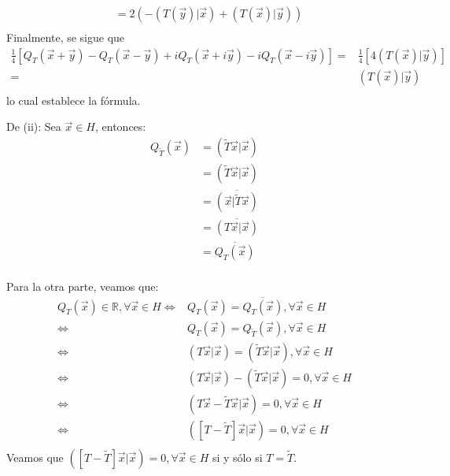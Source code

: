 \documentclass[12pt]{report}
\newcounter{it}
\theoremstyle{largebreak}
\newcommand\adj[1]{\ensuremath{\widetilde{#1}}}
\newcommand\pint[2]{\ensuremath{\left(#1\big|#2\right)}}
\newcommand\conj[1]{\ensuremath{\overline{#1}}}
\begin{document}
\begin{sol}
\begin{equation*}
\begin{split}
                &=2\left(-\pint{T(\vec{y})}{\vec{x}}+\pint{T(\vec{x})}{\vec{y}}\right)\\
            \end{split}
        \end{equation*}
        Finalmente, se sigue que
        \begin{equation*}
            \begin{split}
                \frac{1}{4}\left[Q_T(\vec{x}+\vec{y})-Q_T(\vec{x}-\vec{y})+iQ_T(\vec{x}+i\vec{y})-iQ_T(\vec{x}-i\vec{y})\right]=&\frac{1}{4}\left[4\pint{T(\vec{x})}{\vec{y}}\right] \\
                =&\pint{T(\vec{x})}{\vec{y}}\\
            \end{split}
        \end{equation*}
        lo cual establece la fórmula.

        De (ii): Sea $\vec{x}\in H$, entonces:
        \begin{equation*}
            \begin{split}
                Q_{\adj{T}}(\vec{x})&=\pint{\adj{T}\vec{x}}{\vec{x}}\\
                &=\pint{\adj{T}\vec{x}}{\vec{x}}\\
                &=\conj{\pint{\vec{x}}{\adj{T}\vec{x}}}\\
                &=\conj{\pint{T\vec{x}}{\vec{x}}}\\
                &=\conj{Q_T(\vec{x})}\\
            \end{split}
        \end{equation*}

        Para la otra parte, veamos que:
        \begin{equation*}
            \begin{split}
                Q_T(\vec{x})\in\mathbb{R},\forall\vec{x}\in H\iff&Q_T(\vec{x})=\conj{Q_T(\vec{x})},\forall\vec{x}\in H\\
                \iff&Q_T(\vec{x})=Q_{\adj{T}}(\vec{x}),\forall\vec{x}\in H\\
                \iff&\pint{T\vec{x}}{\vec{x}}=\pint{\adj{T}\vec{x}}{\vec{x}},\forall\vec{x}\in H\\
                \iff&\pint{T\vec{x}}{\vec{x}}-\pint{\adj{T}\vec{x}}{\vec{x}}=0,\forall\vec{x}\in H\\
                \iff&\pint{T\vec{x}-\adj{T}\vec{x}}{\vec{x}}=0,\forall\vec{x}\in H\\
                \iff&\pint{\left[T-\adj{T}\right]\vec{x}}{\vec{x}}=0,\forall\vec{x}\in H\\
            \end{split}
        \end{equation*}
        Veamos que $\pint{\left[T-\adj{T}\right]\vec{x}}{\vec{x}}=0,\forall\vec{x}\in H$ si y sólo si $T=\adj{T}$.


\end{sol}
\end{document}
